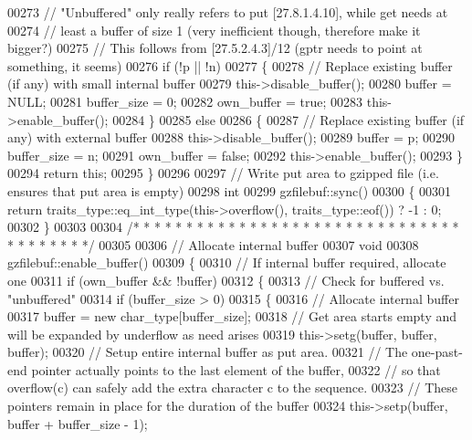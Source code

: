\begin{DoxyCode}
{00273   \textcolor{comment}{// "Unbuffered" only really refers to put [27.8.1.4.10], while get needs at}
00274   \textcolor{comment}{// least a buffer of size 1 (very inefficient though, therefore make it bigger?)}
00275   \textcolor{comment}{// This follows from [27.5.2.4.3]/12 (gptr needs to point at something, it seems)}
00276   \textcolor{keywordflow}{if} (!p || !n)
00277   \{
00278     \textcolor{comment}{// Replace existing buffer (if any) with small internal buffer}
00279     this->disable\_buffer();
00280     buffer = NULL;
00281     buffer\_size = 0;
00282     own\_buffer = \textcolor{keyword}{true};
00283     this->enable\_buffer();
00284   \}
00285   \textcolor{keywordflow}{else}
00286   \{
00287     \textcolor{comment}{// Replace existing buffer (if any) with external buffer}
00288     this->disable\_buffer();
00289     buffer = p;
00290     buffer\_size = n;
00291     own\_buffer = \textcolor{keyword}{false};
00292     this->enable\_buffer();
00293   \}
00294   \textcolor{keywordflow}{return} \textcolor{keyword}{this};
00295 \}
00296 
00297 \textcolor{comment}{// Write put area to gzipped file (i.e. ensures that put area is empty)}
00298 \textcolor{keywordtype}{int}
00299 gzfilebuf::sync()
00300 \{
00301   \textcolor{keywordflow}{return} traits\_type::eq\_int\_type(this->overflow(), traits\_type::eof()) ? -1 : 0;
00302 \}
00303 
00304 \textcolor{comment}{/* * * * * * * * * * * * * * * * * * * * * * * * * * * * * * * * * * * * * * */}
00305 
00306 \textcolor{comment}{// Allocate internal buffer}
00307 \textcolor{keywordtype}{void}
00308 gzfilebuf::enable\_buffer()
00309 \{
00310   \textcolor{comment}{// If internal buffer required, allocate one}
00311   \textcolor{keywordflow}{if} (own\_buffer && !buffer)
00312   \{
00313     \textcolor{comment}{// Check for buffered vs. "unbuffered"}
00314     \textcolor{keywordflow}{if} (buffer\_size > 0)
00315     \{
00316       \textcolor{comment}{// Allocate internal buffer}
00317       buffer = \textcolor{keyword}{new} char\_type[buffer\_size];
00318       \textcolor{comment}{// Get area starts empty and will be expanded by underflow as need arises}
00319       this->setg(buffer, buffer, buffer);
00320       \textcolor{comment}{// Setup entire internal buffer as put area.}
00321       \textcolor{comment}{// The one-past-end pointer actually points to the last element of the buffer,}
00322       \textcolor{comment}{// so that overflow(c) can safely add the extra character c to the sequence.}
00323       \textcolor{comment}{// These pointers remain in place for the duration of the buffer}
00324       this->setp(buffer, buffer + buffer\_size - 1);
}
\end{DoxyCode}
